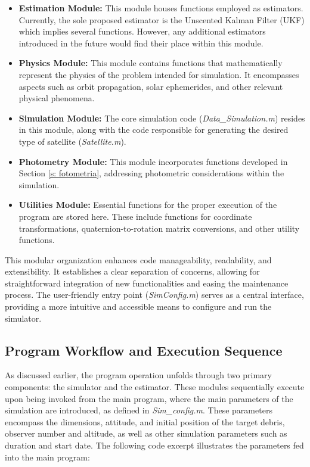 \begin{itemize}
    \item \textbf{Estimation Module:} This module houses functions employed as estimators. Currently, the sole proposed estimator is the Unscented Kalman Filter (UKF) which implies several functions. However, any additional estimators introduced in the future would find their place within this module.

    \item \textbf{Physics Module:} This module contains functions that mathematically represent the physics of the problem intended for simulation. It encompasses aspects such as orbit propagation, solar ephemerides, and other relevant physical phenomena.

    \item \textbf{Simulation Module:} The core simulation code (\textit{Data\_Simulation.m}) resides in this module, along with the code responsible for generating the desired type of satellite (\textit{Satellite.m}).

    \item \textbf{Photometry Module:} This module incorporates functions developed in Section \ref{s: fotometria}, addressing photometric considerations within the simulation.

    \item \textbf{Utilities Module:} Essential functions for the proper execution of the program are stored here. These include functions for coordinate transformations, quaternion-to-rotation matrix conversions, and other utility functions.
\end{itemize}

This modular organization enhances code manageability, readability, and extensibility. It establishes a clear separation of concerns, allowing for straightforward integration of new functionalities and easing the maintenance process. The user-friendly entry point (\textit{SimConfig.m}) serves as a central interface, providing a more intuitive and accessible means to configure and run the simulator.

\subsection{Program Workflow and Execution Sequence}
As discussed earlier, the program operation unfolds through two primary components: the simulator and the estimator. These modules sequentially execute upon being invoked from the main program, where the main parameters of the simulation are introduced, as defined in \textit{Sim\_config.m}. These parameters encompass the dimensions, attitude, and initial position of the target debris, observer number and altitude, as well as other simulation parameters such as duration and start date. The following code excerpt illustrates the parameters fed into the main program:


